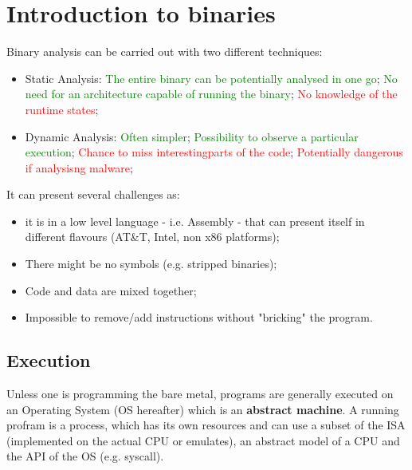 \chapter{Introduction to binaries}
Binary analysis can be carried out with two different techniques:
\begin{itemize} 
    \item Static Analysis: 
        \subitem \textcolor{green}{The entire binary can be potentially analysed in one go}; 
        \subitem\textcolor{green}{No need for an architecture capable of running the binary};
        \subitem \textcolor{red}{No knowledge of the runtime states};
    \item Dynamic Analysis: \subitem \textcolor{green}{Often simpler};
        \subitem \textcolor{green}{Possibility to observe a particular execution};
        \subitem \textcolor{red}{Chance to miss interestingparts of the code}; 
        \subitem \textcolor{red}{Potentially dangerous if analysisng malware}; 
        \end{itemize} 
It can present several challenges as: 
\begin{itemize} 
    \item it is in a low level language - i.e. Assembly - that can present itself in different flavours 
    (AT\&T, Intel, non x86 platforms); 
    \item There might be no symbols (e.g.  stripped binaries);
    \item Code and data are mixed together; 
    \item Impossible to remove/add instructions without "bricking" the program. 
\end{itemize} 
\section{Execution} 
Unless one is programming the bare metal, programs are generally executed on an Operating System (OS hereafter) which 
is an \textbf{abstract machine}.  A running profram is a process, which has its own resources and can use a subset of 
the ISA (implemented on the actual CPU or emulates), an abstract model of a CPU and the API of the OS (e.g. syscall).
